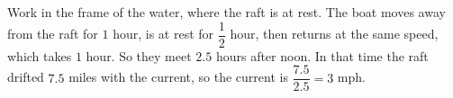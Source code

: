 Work in the frame of the water, where the raft is at rest. The boat moves away from the raft for $1$ hour, is at rest for $\dfrac12$ hour, then returns at the same speed, which takes $1$ hour. So they meet $2.5$ hours after noon. In that time the raft drifted $7.5$ miles with the current, so the current is $\dfrac{7.5}{2.5}=\boxed{3}$ mph.
